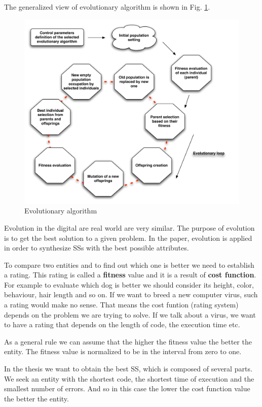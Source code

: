 \documentclass[review]{elsarticle}
\begin{document}
The generalized view of evolutionary algorithm is shown in Fig. \ref{pict:soma}.

\begin{figure}[h!]
\caption{Evolutionary algorithm}
\label{pict:soma}
\includegraphics[scale=0.65]{pict/soma.pdf}
\end{figure}


Evolution in the digital are real world are very similar. The purpose of evolution is to get the best solution to a given problem. In the paper, evolution is applied in order to synthesize SSs with the best possible attributes.
\vspace{10pt}

\label{fitness} To compare two entities and to find out which one is better we need to establish a rating. This rating is called a \textbf{fitness} value and it is a result of \textbf{cost function}. \cite{soma} For example to evaluate which dog is better we should consider its height, color, behaviour, hair length and so on. If we want to breed a new computer virus, such a rating would make no sense. That means the cost funtion (rating system) depends on the problem we are trying to solve. If we talk about a virus, we want to have a rating that depends on the length of code, the execution time etc.

As a general rule we can assume that the higher the fitness value the better the entity. The fitness value is normalized to be in the interval from zero to one.

In the thesis we want to obtain the best SS, which is composed of several parts. We seek an entity with the shortest code, the shortest time of execution and the smallest number of errors. And so in this case the lower the cost function value the better the entity.
\end{document}
